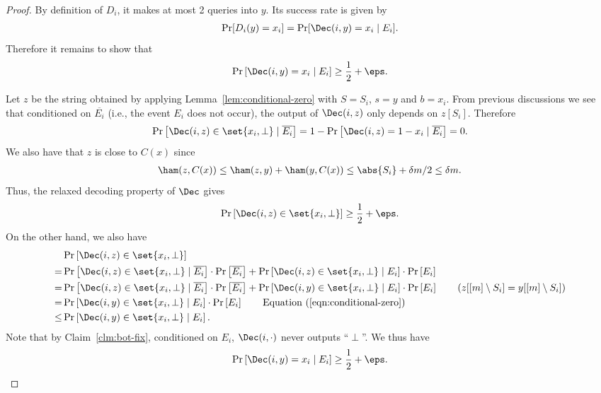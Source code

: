 \begin{proof}
	By definition of $D_i$, it makes at most 2 queries into $y$. Its success rate is given by
	\begin{align*}
	    \Pr[D_i(y) = x_i] = \Pr[\Dec(i,y) = x_i \mid E_i].
	\end{align*}
	Therefore it remains to show that
	\begin{align*}
		\Pr\left[ \Dec(i,y) = x_i \mid E_i \right] \ge \frac{1}{2} + \eps.
	\end{align*} 
	
	Let $z$ be the string obtained by applying Lemma~\ref{lem:conditional-zero} with $S=S_i$, $s=y$ and $b=x_i$. From previous discussions we see that conditioned on $\overline{E_i}$ (i.e., the event $E_i$ does not occur), the output of $\Dec(i,z)$ only depends on $z[S_i]$. Therefore
	\begin{align}
		\Pr\left[ \Dec(i, z) \in \set{x_i, \perp} \mid \overline{E_i} \right] = 1-\Pr\left[ \Dec(i, z) = 1-x_i \mid \overline{E_i} \right] = 0.
		\label{eqn:conditional-zero}
	\end{align}
	We also have that $z$ is close to $C(x)$ since
	\begin{align*}
	\ham(z, C(x)) \le \ham(z, y) + \ham(y, C(x)) \le \abs{S_i} + \delta m/2 \le \delta m.
	\end{align*}
	Thus, the relaxed decoding property of $\Dec$ gives
	\begin{align*}
	\Pr\left[ \Dec(i, z) \in \set{x_i, \perp} \right] \ge \frac{1}{2} + \eps.
	\end{align*}
	On the other hand, we also have
	\begin{align*}
	 & \Pr\left[ \Dec(i, z) \in \set{x_i, \perp} \right] \\
	=& \Pr\left[ \Dec(i, z) \in \set{x_i, \perp} \mid \overline{E_i} \right] \cdot \Pr\left[ \overline{E_i} \right] + \Pr\left[ \Dec(i, z) \in \set{x_i, \perp} \mid E_i \right] \cdot \Pr\left[ E_i \right] \\
	=& \Pr\left[ \Dec(i, z) \in \set{x_i, \perp} \mid \overline{E_i} \right] \cdot \Pr\left[ \overline{E_i} \right] + \Pr\left[ \Dec(i, y) \in \set{x_i, \perp} \mid E_i \right] \cdot \Pr\left[ E_i \right] \tag*{($z[[m]\setminus S_i]=y[[m]\setminus S_i]$)} \\
	=& \Pr\left[ \Dec(i, y) \in \set{x_i, \perp} \mid E_i \right] \cdot \Pr\left[ E_i \right]  \tag*{Equation (\ref{eqn:conditional-zero})}\\
	\le& \Pr\left[ \Dec(i, y) \in \set{x_i, \perp} \mid E_i \right].
	\end{align*}
	Note that by Claim~\ref{clm:bot-fix}, conditioned on $E_i$, $\Dec(i,\cdot)$ never outputs ``$\perp$''. We thus have 
	\begin{align*}
	\Pr\left[ \Dec(i, y) = x_i \mid E_i \right] \ge \frac{1}{2} + \eps.
	\end{align*}
\end{proof}

